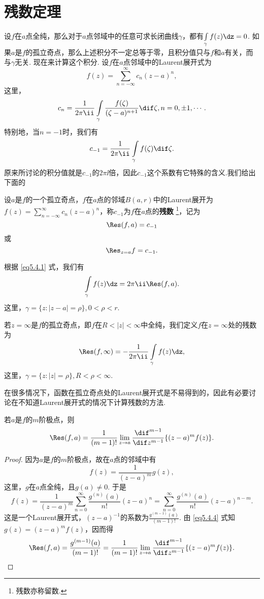 \section{残数定理\label{sec5.4}}
设$f$在$a$点全纯，那么对于$a$点邻域中的任意可求长闭曲线$\gamma$，都有$\int\limits_\gamma f(z)\dz=0$. 如果$a$是$f$的孤立奇点，那么上述积分不一定总等于零，且积分值只与$f$和$a$有关，而与$\gamma$无关. 现在来计算这个积分. 设$f$在$a$点邻域中的Laurent展开式为
\[f(z)=\sum_{n=-\infty}^\infty c_n(z-a)^n,\]
这里，
\[c_n=\frac1{2\pi\ii}\int\limits_{\gamma}\frac{f(\zeta)}{(\zeta-a)^{n+1}}\dif \zeta,n=0,\pm1,\cdots.\]
特别地，当$n=-1$时，我们有
\begin{equation}\label{eq5.4.1}
c_{-1}=\frac1{2\pi\ii}\int\limits_{\gamma}f(\zeta)\dif \zeta.
\end{equation}
原来所讨论的积分值就是$c_{-1}$的$2\pi\ii$倍，因此$c_{-1}$这个系数有它特殊的含义.我们给出下面的
\begin{definition}\label{def5.4.1}
设$a$是$f$的一个孤立奇点，$f$在$a$点的邻域$B(a,r)$中的Laurent展开为$f(z)=\sum_{n=-\infty}^\infty c_n(z-a)^n$，称$c_{-1}$为$f$在$a$点的\textbf{残数}
\footnote{残数亦称留数.}，记为
\[\Res(f,a)=c_{-1}\]
或
\[\Res_{z=a}f=c_{-1}.\]
\end{definition}

根据 \eqref{eq5.4.1} 式，我们有
\begin{equation}\label{eq5.4.2}
\int\limits_\gamma f(z)\dz=2\pi\ii\Res(f,a).
\end{equation}
这里，$\gamma=\{z:|z-a|=\rho\},0<\rho<r$.

若$z=\infty$是$f$的孤立奇点，即$f$在$R<|z|<\infty$中全纯，我们定义$f$在$z=\infty$处的残数为
\begin{equation}\label{eq5.4.3}
\Res(f,\infty)=-\frac1{2\pi\ii}\int\limits_\gamma f(z)\dz,
\end{equation}
这里，$\gamma=\{z:|z|=\rho\},R<\rho<\infty$.

在很多情况下，函数在孤立奇点处的Laurent展开式是不易得到的，因此有必要讨论在不知道Laurent展开式的情况下计算残数的方法.

\begin{prop}\label{prop5.4.2}
若$a$是$f$的$m$阶极点，则
\[\Res(f,a)=\frac1{(m-1)!}\lim_{z\to a}\frac{\dif ^{m-1}}{\dif z^{m-1}}
\{(z-a)^mf(z)\}.\]
\end{prop}
\begin{proof}
因为$a$是$f$的$m$阶极点，故在$a$点的邻域中有
\begin{equation}\label{eq5.4.4}
f(z)=\frac1{(z-a)^m}g(z),
\end{equation}
这里，$g$在$a$点全纯，且$g(a)\ne0$. 于是
\[f(z)=\frac1{(z-a)^m}\sum_{n=0}^\infty\frac{g^{(n)}(a)}{n!}(z-a)^n
=\sum_{n=0}^\infty\frac{g^{(n)}(a)}{n!}(z-a)^{n-m}.\]
这是一个Laurent展开式，$(z-a)^{-1}$的系数为$\frac{g^{(m-1)}(a)}{(m-1)!}$. 由 \eqref{eq5.4.4} 式知$g(z)=(z-a)^mf(z)$，因而得
\begin{equation*}
  \Res(f,a) = \frac{g^{(m-1)}(a)}{(m-1)!} = \frac1{(m-1)!}\lim_{z\to a}\frac{\dif ^{m-1}}{\dif z^{m-1}}\{(z-a)^mf(z)\}. \qedhere
\end{equation*}
\end{proof}

